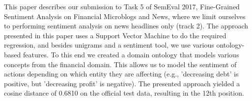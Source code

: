 This paper describes our submission to Task 5 of SemEval 2017, Fine-Grained Sentiment Analysis on Financial Microblogs and News, where we limit ourselves to performing sentiment analysis on news headlines only (track 2). The approach presented in this paper uses a Support Vector Machine to do the required regression, and besides unigrams and a sentiment tool, we use various ontology-based features. To this end we created a domain ontology that models various concepts from the financial domain. This allows us to model the sentiment of actions depending on which entity they are affecting (e.g., 'decreasing debt' is positive, but 'decreasing profit' is negative). The presented approach yielded a cosine distance of 0.6810 on the official test data, resulting in the 12th position.
